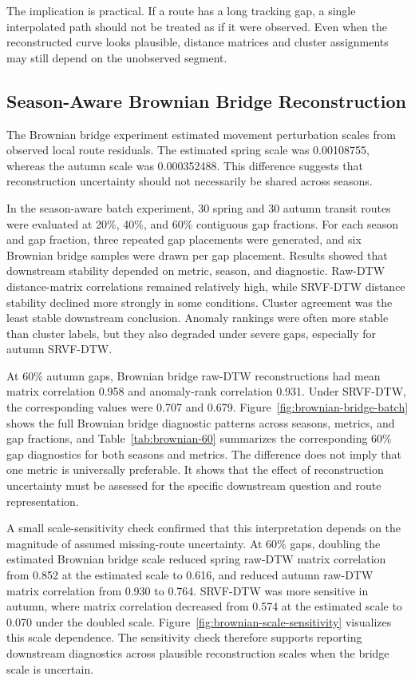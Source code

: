 The implication is practical. If a route has a long tracking gap, a single interpolated path should not be treated as if it were observed. Even when the reconstructed curve looks plausible, distance matrices and cluster assignments may still depend on the unobserved segment.

\subsection{Season-Aware Brownian Bridge Reconstruction}\label{season-aware-brownian-bridge-reconstruction}

The Brownian bridge experiment estimated movement perturbation scales from observed local route residuals. The estimated spring scale was 0.00108755, whereas the autumn scale was 0.000352488. This difference suggests that reconstruction uncertainty should not necessarily be shared across seasons.

In the season-aware batch experiment, 30 spring and 30 autumn transit routes were evaluated at 20\%, 40\%, and 60\% contiguous gap fractions. For each season and gap fraction, three repeated gap placements were generated, and six Brownian bridge samples were drawn per gap placement. Results showed that downstream stability depended on metric, season, and diagnostic. Raw-DTW distance-matrix correlations remained relatively high, while SRVF-DTW distance stability declined more strongly in some conditions. Cluster agreement was the least stable downstream conclusion. Anomaly rankings were often more stable than cluster labels, but they also degraded under severe gaps, especially for autumn SRVF-DTW.

At 60\% autumn gaps, Brownian bridge raw-DTW reconstructions had mean matrix correlation 0.958 and anomaly-rank correlation 0.931. Under SRVF-DTW, the corresponding values were 0.707 and 0.679. Figure~\ref{fig:brownian-bridge-batch} shows the full Brownian bridge diagnostic patterns across seasons, metrics, and gap fractions, and Table~\ref{tab:brownian-60} summarizes the corresponding 60\% gap diagnostics for both seasons and metrics. The difference does not imply that one metric is universally preferable. It shows that the effect of reconstruction uncertainty must be assessed for the specific downstream question and route representation.

A small scale-sensitivity check confirmed that this interpretation depends on the magnitude of assumed missing-route uncertainty. At 60\% gaps, doubling the estimated Brownian bridge scale reduced spring raw-DTW matrix correlation from 0.852 at the estimated scale to 0.616, and reduced autumn raw-DTW matrix correlation from 0.930 to 0.764. SRVF-DTW was more sensitive in autumn, where matrix correlation decreased from 0.574 at the estimated scale to 0.070 under the doubled scale. Figure~\ref{fig:brownian-scale-sensitivity} visualizes this scale dependence. The sensitivity check therefore supports reporting downstream diagnostics across plausible reconstruction scales when the bridge scale is uncertain.

